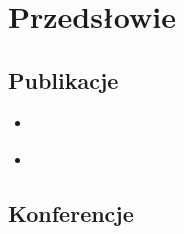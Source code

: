\chapter{Przedsłowie}\label{chapter:intro}

\section{Publikacje}\label{intro:publications}
\begin{itemize}
  \item \cite{wieclaw21}
  \item \cite{stecko18}
\end{itemize}

\section{Konferencje}\label{intro:conferences}
